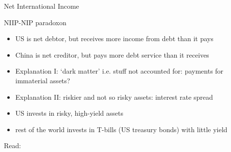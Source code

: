 \begin{frame}{Net International Income}
\end{frame}

\begin{frame}{NIIP-NIP paradoxon}
    \begin{itemize}
        \item US is net debtor, but receives more income from debt than it pays
        \item China is net creditor, but pays more debt service than it receives
        \item Explanation I: `dark matter' i.e. stuff not accounted for: payments for immaterial assets?
        \item Explanation II: riskier and not so risky assets: interest rate spread
        \item US invests in risky, high-yield assets
        \item rest of the world invests in T-bills (US treasury bonds) with little yield
    \end{itemize}
    Read: \cite{schmitt-grohe-slides}
\end{frame}


